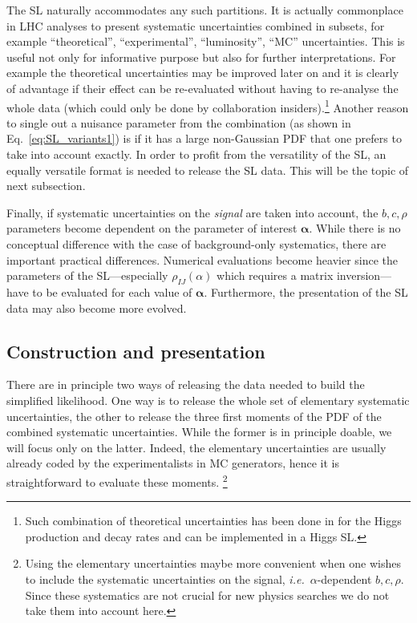 \documentclass[11pt]{article}
\def\ie{{\it i.e.}}
\begin{document}
The SL naturally accommodates any such partitions. It is actually  commonplace in LHC analyses   to present systematic uncertainties combined in subsets, for example ``theoretical'', ``experimental'', ``luminosity'', ``MC'' uncertainties. 
This is useful not only for informative purpose but also for further interpretations. 
For example the theoretical uncertainties may be improved later on 
and it is clearly of advantage if their effect can be re-evaluated without having to re-analyse the whole data (which could only be done by collaboration insiders).\footnote{Such combination of theoretical uncertainties  has been done in \cite{Arbey:2016kqi}  for the Higgs production and decay rates and can be implemented in a Higgs SL.}
Another reason to single out a nuisance parameter  from the combination (as shown in Eq.~\eqref{eq:SL_variants1})
is if it has a large non-Gaussian PDF that one prefers to take into account exactly.
In order to profit from the  versatility of the SL, an equally  versatile format is needed to release the SL data. This will be the topic of next subsection.

Finally, if systematic uncertainties on the \textit{signal} are taken into account, the $b,c,\rho$ parameters  become dependent on the parameter of interest ${\bm \alpha}$. While there is no conceptual difference with the case  of background-only systematics, there are important practical differences. Numerical evaluations  become heavier  since  the parameters of the SL---especially $\rho_{IJ}(\alpha)$ which requires a matrix inversion---have to be evaluated for each value of ${\bm \alpha}$. Furthermore, the presentation of the SL data may also become more evolved.


\subsection{Construction and  presentation}


There are in principle two ways of releasing the data needed to build the simplified likelihood. One way %
is to release the whole set of elementary systematic uncertainties, the other to release the three first moments of the PDF of the combined systematic uncertainties. While the former is in principle doable, we will focus only on the latter. Indeed, the elementary uncertainties are usually already  coded by the experimentalists in MC generators, hence it is straightforward to evaluate these moments.%
\footnote{Using the elementary uncertainties maybe more convenient when one wishes to include the systematic uncertainties on the signal, \ie\  $\alpha$-dependent $b,c,\rho$. Since these systematics are not crucial for new physics searches we do not take them into account here.}
\end{document}
